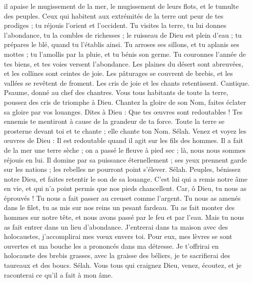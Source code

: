 \begin{multicols}{2}
il apaise le mugissement de la mer, le mugissement de leurs flots, et le tumulte des peuples.
Ceux qui habitent aux extrémités de la terre ont peur de tes prodiges ; tu réjouis l'orient et l'occident.
Tu visites la terre, tu lui donnes l'abondance, tu la combles de richesses ; le ruisseau de Dieu est plein d'eau ; tu prépares le blé, quand tu l'établis ainsi.
Tu arroses ses sillons, et tu aplanis ses mottes ; tu l'amollis par la pluie, et tu bénis son germe.
Tu couronnes l'année de tes biens, et tes voies versent l'abondance.
Les plaines du désert sont abreuvées, et les collines sont ceintes de joie.
Les pâturages se couvrent de brebis, et les vallées se revêtent de froment. Les cris de joie et les chants retentissent.
\VerseOne{}Cantique. Psaume, donné au chef des chantres. Vous tous habitants de toute la terre, poussez des cris de triomphe à Dieu.
Chantez la gloire de son Nom, faites éclater sa gloire par vos louanges.
Dites à Dieu : Que tes œuvres sont redoutables ! Tes ennemis te mentiront à cause de la grandeur de ta force.
Toute la terre se prosterne devant toi et te chante ; elle chante ton Nom. Sélah.
Venez et voyez les œuvres de Dieu : Il est redoutable quand il agit sur les fils des hommes.
Il a fait de la mer une terre sèche ; on a passé le fleuve à pied sec ; là, nous nous sommes réjouis en lui.
Il domine par sa puissance éternellement ; ses yeux prennent garde sur les nations ; les rebelles ne pourront point s'élever. Sélah.
Peuples, bénissez notre Dieu, et faites retentir le son de sa louange.
C'est lui qui a remis notre âme en vie, et qui n'a point permis que nos pieds chancellent.
Car, ô Dieu, tu nous as éprouvés ! Tu nous a fait passer au creuset comme l'argent.
Tu nous as amenés dans le filet, tu as mis sur nos reins un pesant fardeau.
Tu as fait monter des hommes sur notre tête, et nous avons passé par le feu et par l'eau. Mais tu nous as fait entrer dans un lieu d'abondance.
J'entrerai dans ta maison avec des holocaustes, j'accomplirai mes vœux envers toi.
Pour eux, mes lèvres se sont ouvertes et ma bouche les a prononcés dans ma détresse.
Je t'offrirai en holocauste des brebis grasses, avec la graisse des béliers, je te sacrifierai des taureaux et des boucs. Sélah.
Vous tous qui craignez Dieu, venez, écoutez, et je raconterai ce qu'il a fait à mon âme.

\end{multicols}
